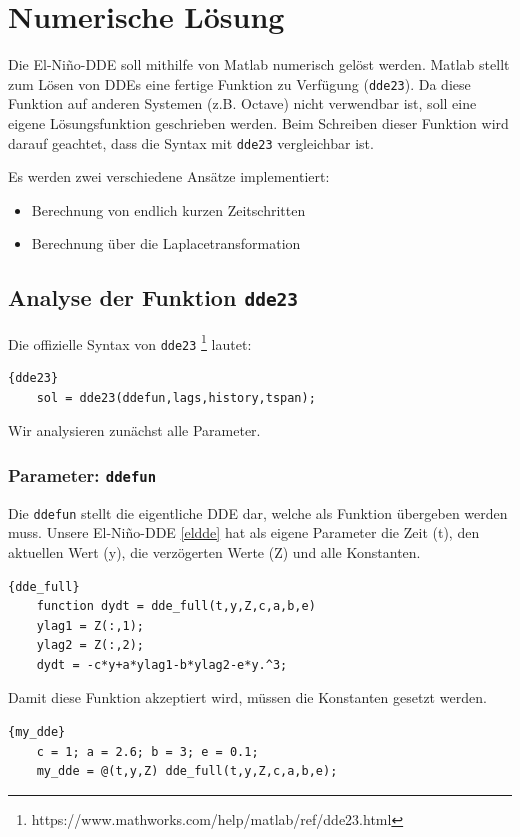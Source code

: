 \section{Numerische Lösung}

Die El-Niño-DDE soll mithilfe von Matlab numerisch gelöst werden.
Matlab stellt zum Lösen von DDEs eine fertige Funktion zu Verfügung (\texttt{dde23}).
Da diese Funktion auf anderen Systemen (z.B. Octave) nicht verwendbar ist, soll eine eigene Lösungsfunktion geschrieben werden.
Beim Schreiben dieser Funktion wird darauf geachtet, dass die Syntax mit \texttt{dde23} vergleichbar ist. 

Es werden zwei verschiedene Ansätze implementiert: 
\begin{itemize}
	\item Berechnung von endlich kurzen Zeitschritten
	\item Berechnung über die Laplacetransformation
\end{itemize}

\subsection{Analyse der Funktion \texttt{dde23}}
Die offizielle Syntax von \texttt{dde23} \footnote{https://www.mathworks.com/help/matlab/ref/dde23.html} lautet: 
\begin{lstlisting}[style=MATLAB]{dde23}
	sol = dde23(ddefun,lags,history,tspan);
\end{lstlisting}
Wir analysieren zunächst alle Parameter.

\subsubsection{Parameter: \texttt{ddefun}}
Die \texttt{ddefun} stellt die eigentliche DDE dar, welche als Funktion übergeben werden muss.
Unsere El-Niño-DDE \eqref{eldde} hat als eigene Parameter die Zeit (t), den aktuellen Wert (y), die verzögerten Werte (Z) und alle Konstanten.
\begin{lstlisting}[style=MATLAB]{dde_full}
	function dydt = dde_full(t,y,Z,c,a,b,e)
	ylag1 = Z(:,1);
	ylag2 = Z(:,2);
	dydt = -c*y+a*ylag1-b*ylag2-e*y.^3;
\end{lstlisting}
Damit diese Funktion akzeptiert wird, müssen die Konstanten gesetzt werden.
\begin{lstlisting}[style=MATLAB]{my_dde}
	c = 1; a = 2.6; b = 3; e = 0.1;
	my_dde = @(t,y,Z) dde_full(t,y,Z,c,a,b,e);
\end{lstlisting}

